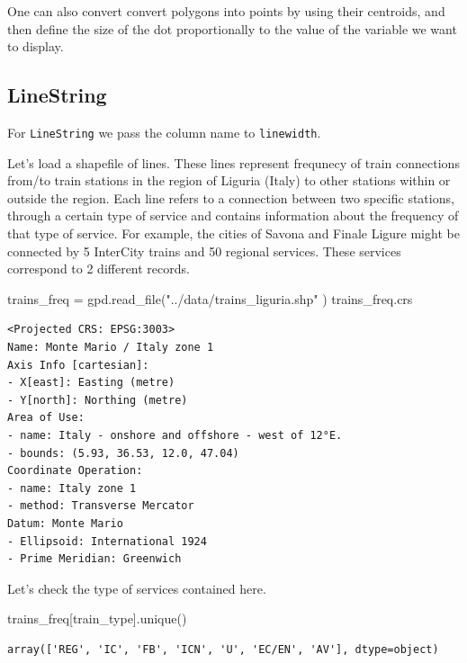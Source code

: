 \documentclass[
  letterpaper,
  DIV=11,
  numbers=noendperiod]{scrreprt}
\newenvironment{Shaded}{\begin{snugshade}}{\end{snugshade}}
\newcommand{\NormalTok}[1]{\textcolor[rgb]{0.00,0.23,0.31}{#1}}
\newcommand{\OperatorTok}[1]{\textcolor[rgb]{0.37,0.37,0.37}{#1}}
\newcommand{\StringTok}[1]{\textcolor[rgb]{0.13,0.47,0.30}{#1}}
\begin{document}
One can also convert convert polygons into points by using their
centroids, and then define the size of the dot proportionally to the
value of the variable we want to display.

\subsection{LineString}\label{linestring}

For \texttt{LineString} we pass the column name to \texttt{linewidth}.

Let's load a shapefile of lines. These lines represent frequnecy of
train connections from/to train stations in the region of Liguria
(Italy) to other stations within or outside the region. Each line refers
to a connection between two specific stations, through a certain type of
service and contains information about the frequency of that type of
service. For example, the cities of Savona and Finale Ligure might be
connected by 5 InterCity trains and 50 regional services. These services
correspond to 2 different records.

\begin{Shaded}
\begin{Highlighting}[]
\NormalTok{trains\_freq }\OperatorTok{=}\NormalTok{ gpd.read\_file(}\StringTok{"../data/trains\_liguria.shp"}\NormalTok{ )}
\NormalTok{trains\_freq.crs}
\end{Highlighting}
\end{Shaded}

\begin{verbatim}
<Projected CRS: EPSG:3003>
Name: Monte Mario / Italy zone 1
Axis Info [cartesian]:
- X[east]: Easting (metre)
- Y[north]: Northing (metre)
Area of Use:
- name: Italy - onshore and offshore - west of 12°E.
- bounds: (5.93, 36.53, 12.0, 47.04)
Coordinate Operation:
- name: Italy zone 1
- method: Transverse Mercator
Datum: Monte Mario
- Ellipsoid: International 1924
- Prime Meridian: Greenwich
\end{verbatim}

Let's check the type of services contained here.

\begin{Shaded}
\begin{Highlighting}[]
\NormalTok{trains\_freq[}\StringTok{\textquotesingle{}train\_type\textquotesingle{}}\NormalTok{].unique()}
\end{Highlighting}
\end{Shaded}

\begin{verbatim}
array(['REG', 'IC', 'FB', 'ICN', 'U', 'EC/EN', 'AV'], dtype=object)
\end{verbatim}
\end{document}
